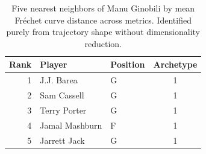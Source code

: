\begin{table}[htbp]
  \centering\small
  \begin{tabular}{rllc}
    \toprule
    Rank & Player & Position & Archetype \\
    \midrule
    1 & J.J. Barea & G & 1 \\
    2 & Sam Cassell & G & 1 \\
    3 & Terry Porter & G & 1 \\
    4 & Jamal Mashburn & F & 1 \\
    5 & Jarrett Jack & G & 1 \\
    \bottomrule
  \end{tabular}
  \caption{Five nearest neighbors of Manu Ginobili by mean Fr\'{e}chet curve distance across metrics. Identified purely from trajectory shape without dimensionality reduction.}
  \label{tab:Manu_Ginobili_frechet_curve_neighbors}
\end{table}

